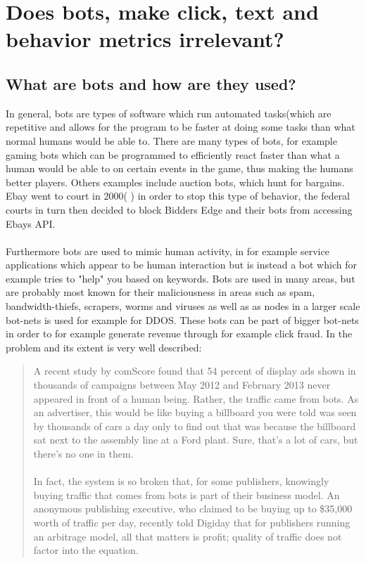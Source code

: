 \chapter[Bot Metrics]{Does bots,  make click, text and behavior metrics irrelevant?}


\section{What are bots and how are they used?}
In general, bots are types of software which run automated tasks(which are repetitive and allows for the program to be faster at doing some tasks than what normal humans would be able to. There are many types of bots, for example gaming bots which can be programmed to efficiently react faster than what a human would be able to on certain events in the game, thus making the humans better players. Others examples include auction bots, which hunt for bargains. Ebay went to court in 2000( \cite{Computerworld:Ebay}) in order to stop this type of behavior, the federal courts in turn then decided to block Bidders Edge and their bots from accessing Ebays API. 
\\
\\
Furthermore bots are used to mimic human activity, in for example service applications which appear to be human interaction but is instead a bot which for example tries to "help" you based on keywords. Bots are used in many areas, but are probably most known for their maliciousness in areas such as spam, bandwidth-thiefs, scrapers, worms and viruses as well as as nodes in a larger scale bot-nets is used for example for DDOS. These bots can be part of bigger bot-nets in order to for example generate revenue through for example click fraud. 
\newpage 
In \cite{Observer:FakeTRAF} the problem and its extent is very well described: \begin{quote}
A recent study by comScore found that 54 percent of display ads shown in thousands of campaigns between May 2012 and February 2013 never appeared in front of a human being. Rather, the traffic came from bots. As an advertiser, this would be like buying a billboard you were told was seen by thousands of cars a day only to find out that was because the billboard sat next to the assembly line at a Ford plant. Sure, that’s a lot of cars, but there’s no one in them.
\\
\\
In fact, the system is so broken that, for some publishers, knowingly buying traffic that comes from bots is part of their business model. An anonymous publishing executive, who claimed to be buying up to \$35,000 worth of traffic per day, recently told Digiday that for publishers running an arbitrage model, all that matters is profit; quality of traffic does not factor into the equation.
\newline \mbox{} \hfill \citet{Observer:FakeTRAF}
\end{quote}
